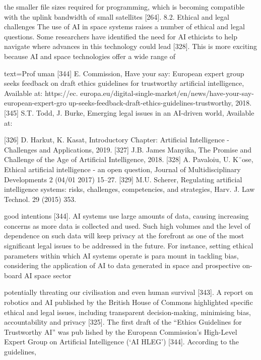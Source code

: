 \documentclass[a4paper,12pt]{article}
\begin{document}
the smaller file sizes required for programming, which is becoming 
compatible with the uplink bandwidth of small satellites [264]. 
8.2. Ethical and legal challenges 
The use of AI in space systems raises a number of ethical and legal 
questions. Some researchers have identified the need for AI ethicists to 
help navigate where advances in this technology could lead [328]. This 
is more exciting because AI and space technologies offer a wide range of

text=Prof%
uman%
[344] E. Commission, Have your say: European expert group seeks feedback on draft 
ethics guidelines for trustworthy artificial intelligence, Available at: https://ec. 
europa.eu/digital-single-market/en/news/have-your-say-european-expert-gro 
up-seeks-feedback-draft-ethics-guidelines-trustworthy, 2018. 
[345] S.T. Todd, J. Burke, Emerging legal issues in an AI-driven world, Available at:

[326] D. Harkut, K. Kasat, Introductory Chapter: Artificial Intelligence - Challenges and 
Applications, 2019. 
[327] J.B. James Manyika, The Promise and Challenge of the Age of Artificial 
Intelligence, 2018. 
[328] A. Pavaloiu, U. K¨ose, Ethical artificial intelligence - an open question, Journal of 
Multidisciplinary Developments 2 (04/01 2017) 15–27. 
[329] M.U. Scherer, Regulating artificial intelligence systems: risks, challenges, 
competencies, and strategies, Harv. J. Law Technol. 29 (2015) 353.

good intentions [344]. 
AI systems use large amounts of data, causing increasing concerns as 
more data is collected and used. Such high volumes and the level of 
dependence on such data will keep privacy at the forefront as one of the 
most significant legal issues to be addressed in the future. For instance, 
setting ethical parameters within which AI systems operate is para­
mount in tackling bias, considering the application of AI to data 
generated in space and prospective on-board AI space sector

potentially threating our civilisation and even human survival [343]. A 
report on robotics and AI published by the British House of Commons 
highlighted specific ethical and legal issues, including transparent 
decision-making, minimising bias, accountability and privacy [325]. 
The first draft of the “Ethics Guidelines for Trustworthy AI” was pub­
lished by the European Commission’s High-Level Expert Group on 
Artificial Intelligence (‘AI HLEG’) [344]. According to the guidelines,
\end{document}
